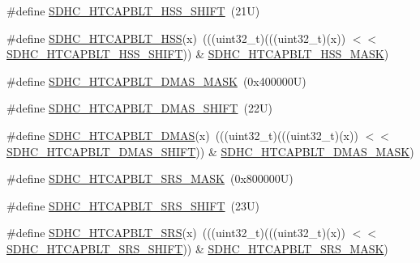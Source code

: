 \begin{DoxyCompactItemize}
\item 
\#define \mbox{\hyperlink{group___s_d_h_c___register___masks_gae24b3d89ddf5bf4bf48ccc6fa948891d}{S\+D\+H\+C\+\_\+\+H\+T\+C\+A\+P\+B\+L\+T\+\_\+\+H\+S\+S\+\_\+\+S\+H\+I\+FT}}~(21\+U)
\item 
\#define \mbox{\hyperlink{group___s_d_h_c___register___masks_ga0f6673e5f8bf15977f7380ae177a3ac3}{S\+D\+H\+C\+\_\+\+H\+T\+C\+A\+P\+B\+L\+T\+\_\+\+H\+SS}}(x)~(((uint32\+\_\+t)(((uint32\+\_\+t)(x)) $<$$<$ \mbox{\hyperlink{group___s_d_h_c___register___masks_gae24b3d89ddf5bf4bf48ccc6fa948891d}{S\+D\+H\+C\+\_\+\+H\+T\+C\+A\+P\+B\+L\+T\+\_\+\+H\+S\+S\+\_\+\+S\+H\+I\+FT}})) \& \mbox{\hyperlink{group___s_d_h_c___register___masks_gabe87f7e9a2aa3b99012eaae8321aed89}{S\+D\+H\+C\+\_\+\+H\+T\+C\+A\+P\+B\+L\+T\+\_\+\+H\+S\+S\+\_\+\+M\+A\+SK}})
\item 
\#define \mbox{\hyperlink{group___s_d_h_c___register___masks_ga5252cbd3675e74a01efa99cf6b754c8a}{S\+D\+H\+C\+\_\+\+H\+T\+C\+A\+P\+B\+L\+T\+\_\+\+D\+M\+A\+S\+\_\+\+M\+A\+SK}}~(0x400000\+U)
\item 
\#define \mbox{\hyperlink{group___s_d_h_c___register___masks_gab0236dd93e36239ae39f6b813eeb11a1}{S\+D\+H\+C\+\_\+\+H\+T\+C\+A\+P\+B\+L\+T\+\_\+\+D\+M\+A\+S\+\_\+\+S\+H\+I\+FT}}~(22\+U)
\item 
\#define \mbox{\hyperlink{group___s_d_h_c___register___masks_gae88148bf06640d20a0d425579207a418}{S\+D\+H\+C\+\_\+\+H\+T\+C\+A\+P\+B\+L\+T\+\_\+\+D\+M\+AS}}(x)~(((uint32\+\_\+t)(((uint32\+\_\+t)(x)) $<$$<$ \mbox{\hyperlink{group___s_d_h_c___register___masks_gab0236dd93e36239ae39f6b813eeb11a1}{S\+D\+H\+C\+\_\+\+H\+T\+C\+A\+P\+B\+L\+T\+\_\+\+D\+M\+A\+S\+\_\+\+S\+H\+I\+FT}})) \& \mbox{\hyperlink{group___s_d_h_c___register___masks_ga5252cbd3675e74a01efa99cf6b754c8a}{S\+D\+H\+C\+\_\+\+H\+T\+C\+A\+P\+B\+L\+T\+\_\+\+D\+M\+A\+S\+\_\+\+M\+A\+SK}})
\item 
\#define \mbox{\hyperlink{group___s_d_h_c___register___masks_ga62e346d8925d26124eb284b4ebf984d3}{S\+D\+H\+C\+\_\+\+H\+T\+C\+A\+P\+B\+L\+T\+\_\+\+S\+R\+S\+\_\+\+M\+A\+SK}}~(0x800000\+U)
\item 
\#define \mbox{\hyperlink{group___s_d_h_c___register___masks_ga47c009f4b74a67296231bb73fa1c74f8}{S\+D\+H\+C\+\_\+\+H\+T\+C\+A\+P\+B\+L\+T\+\_\+\+S\+R\+S\+\_\+\+S\+H\+I\+FT}}~(23\+U)
\item 
\#define \mbox{\hyperlink{group___s_d_h_c___register___masks_ga8f0c45b9e0dbecc30db7678fe744846d}{S\+D\+H\+C\+\_\+\+H\+T\+C\+A\+P\+B\+L\+T\+\_\+\+S\+RS}}(x)~(((uint32\+\_\+t)(((uint32\+\_\+t)(x)) $<$$<$ \mbox{\hyperlink{group___s_d_h_c___register___masks_ga47c009f4b74a67296231bb73fa1c74f8}{S\+D\+H\+C\+\_\+\+H\+T\+C\+A\+P\+B\+L\+T\+\_\+\+S\+R\+S\+\_\+\+S\+H\+I\+FT}})) \& \mbox{\hyperlink{group___s_d_h_c___register___masks_ga62e346d8925d26124eb284b4ebf984d3}{S\+D\+H\+C\+\_\+\+H\+T\+C\+A\+P\+B\+L\+T\+\_\+\+S\+R\+S\+\_\+\+M\+A\+SK}})
$$
\end{DoxyCompactItemize}
